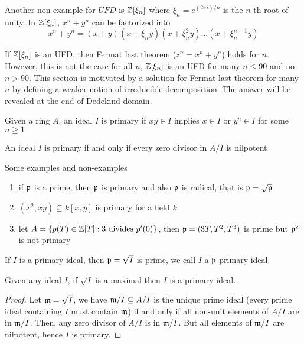 Another non-example for $UFD$ is $\mathbb{Z}[\xi_n]$ where $\xi_n = e^{(2\pi i) / n}$ is the $n$-th root of unity. In $\mathbb{Z}[\xi_n]$, $x^n + y^n$ can be factorized into
$$
	x^n + y^n = (x + y) (x + \xi_n y) (x + \xi_n^2 y) ... (x + \xi_n^{n-1} y)
$$

If $\mathbb{Z}[\xi_n]$ is an UFD, then Fermat last theorem ($z^n = x^n + y^n$) holds for $n$. However, this is not the case for all $n$, $\mathbb{Z}[\xi_n]$ is an UFD for many $n \leq 90$ and no $n > 90$. This section is motivated by a solution for Fermat last theorem for many $n$ by defining a weaker notion of irreducible decomposition. The answer will be revealed at the end of Dedekind domain.


\begin{definition}
	Given a ring $A$, an ideal $I$ is primary if $xy \in I$ implies $x \in I$ or $y^n \in I$ for some $n \geq 1$
\end{definition}

\begin{proposition}
	An ideal $I$ is primary if and only if every zero divisor in $A / I$ is nilpotent
\end{proposition}

\begin{remark}
	Some examples and non-examples
	\begin{enumerate}
		\item if $\mf{p}$ is a prime, then $\mf{p}$ is primary and also $\mf{p}$ is radical, that is $\mathfrak{p} = \sqrt{\mathfrak{p}}$
		\item $(x^2, xy) \subseteq k[x, y]$ is primary for a field $k$
		\item let $A = \{p(T) \in \mathbb{Z}[T]: 3 \text{ divides } p'(0)\}$, then $\mathfrak{p} = (3T, T^2, T^3)$ is prime but $\mathfrak{p}^2$ is not primary
	\end{enumerate}
\end{remark}


\begin{definition}[$\mf{p}$-primary]
	If $I$ is a primary ideal, then $\mathfrak{p} = \sqrt{I}$ is prime, we call $I$ a $\mf{p}$-primary ideal.
\end{definition}

\begin{proposition}
	Given any ideal $I$, if $\sqrt{I}$ is a maximal then $I$ is a primary ideal.
\end{proposition}

\begin{proof}
	Let $\mathfrak{m} = \sqrt{I}$, we have $\mathfrak{m} / I \subseteq A / I$ is the unique prime ideal (every prime ideal containing $I$ must contain $\mathfrak{m}$) if and only if all non-unit elements of $A / I$ are in $\mathfrak{m} / I$. Then, any zero divisor of $A / I$ is in $\mathfrak{m} / I$. But all elements of $\mathfrak{m} / I$ are nilpotent, hence $I$ is primary.
\end{proof}


